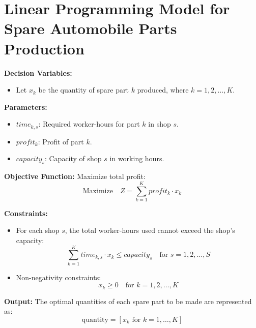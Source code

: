 \documentclass{article}
\begin{document}
\section*{Linear Programming Model for Spare Automobile Parts Production}

\textbf{Decision Variables:}
\begin{itemize}
    \item Let \( x_k \) be the quantity of spare part \( k \) produced, where \( k = 1, 2, \ldots, K \).
\end{itemize}

\textbf{Parameters:}
\begin{itemize}
    \item \( time_{k, s} \): Required worker-hours for part \( k \) in shop \( s \).
    \item \( profit_k \): Profit of part \( k \).
    \item \( capacity_s \): Capacity of shop \( s \) in working hours.
\end{itemize}

\textbf{Objective Function:}
Maximize total profit:
\[
\text{Maximize} \quad Z = \sum_{k=1}^{K} profit_k \cdot x_k
\]

\textbf{Constraints:}
\begin{itemize}
    \item For each shop \( s \), the total worker-hours used cannot exceed the shop's capacity:
    \[
    \sum_{k=1}^{K} time_{k, s} \cdot x_k \leq capacity_s \quad \text{for } s = 1, 2, \ldots, S
    \]
    \item Non-negativity constraints:
    \[
    x_k \geq 0 \quad \text{for } k = 1, 2, \ldots, K
    \]
\end{itemize}

\textbf{Output:}
The optimal quantities of each spare part to be made are represented as:
\[
\text{quantity} = [x_k \text{ for } k = 1, \ldots, K]
\]
\end{document}
